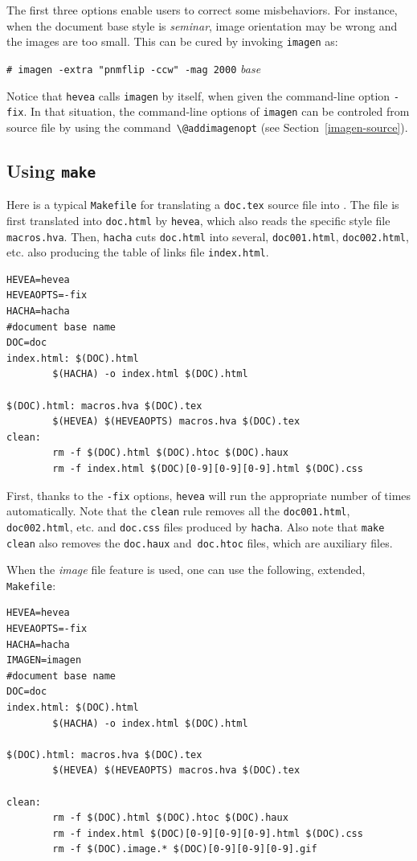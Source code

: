 The first three options enable users to correct some misbehaviors.
For instance, when the document base style is \textit{seminar}, image
orientation may
be wrong and the images are too small. This can be cured by invoking
\texttt{imagen} as:
\begin{flushleft}
\texttt{\# imagen  -extra "pnmflip -ccw" -mag 2000} \textit{base}
\end{flushleft}

Notice that \texttt{hevea} calls \texttt{imagen} by itself,
when given the command-line option \texttt{-fix}.
In that situation, the command-line options of \texttt{imagen} can
be controled from source file by using the
command~\verb+\@addimagenopt+ (see Section~\ref{imagen-source}).

\subsection{Using \texttt{make}}\label{makefile}

Here is a typical \texttt{Makefile} for translating a \texttt{doc.tex}
source file into \html.
The file is first translated into \texttt{doc.html} by \texttt{hevea},
which also reads
the specific style file \texttt{macros.hva}.
Then, \texttt{hacha} cuts \texttt{doc.html} into several,
\texttt{doc001.html}, \texttt{doc002.html}, etc. also producing the
table of links file \texttt{index.html}.
\begin{verbatim}
HEVEA=hevea
HEVEAOPTS=-fix
HACHA=hacha
#document base name
DOC=doc
index.html: $(DOC).html
        $(HACHA) -o index.html $(DOC).html

$(DOC).html: macros.hva $(DOC).tex
        $(HEVEA) $(HEVEAOPTS) macros.hva $(DOC).tex
clean:
        rm -f $(DOC).html $(DOC).htoc $(DOC).haux
        rm -f index.html $(DOC)[0-9][0-9][0-9].html $(DOC).css
\end{verbatim}
First, thanks to the \verb+-fix+ options, \texttt{hevea} will run the
appropriate number of times automatically.
Note that the \texttt{clean} rule removes all the \texttt{doc001.html},
\texttt{doc002.html}, etc. and \texttt{doc.css} files produced by
\texttt{hacha}.
Also note that \texttt{make clean} also removes the
\texttt{doc.haux} and~\texttt{doc.htoc} files, which are \hevea{}
auxiliary files.


When the \textit{image} file feature is used, one can use the
following, extended, \texttt{Makefile}:
\begin{verbatim}
HEVEA=hevea
HEVEAOPTS=-fix
HACHA=hacha
IMAGEN=imagen
#document base name
DOC=doc
index.html: $(DOC).html
        $(HACHA) -o index.html $(DOC).html

$(DOC).html: macros.hva $(DOC).tex
        $(HEVEA) $(HEVEAOPTS) macros.hva $(DOC).tex

clean:
        rm -f $(DOC).html $(DOC).htoc $(DOC).haux
        rm -f index.html $(DOC)[0-9][0-9][0-9].html $(DOC).css
        rm -f $(DOC).image.* $(DOC)[0-9][0-9][0-9].gif
\end{verbatim}

